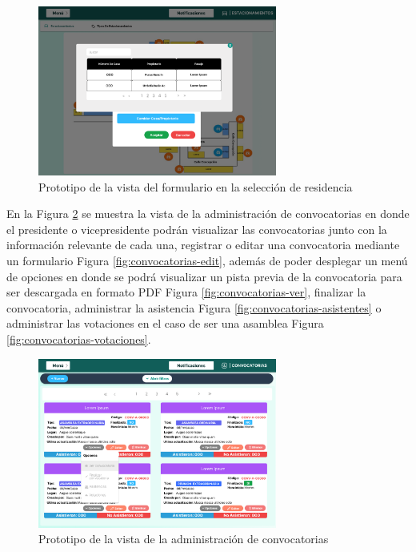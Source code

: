 \begin{figure}[H]
    \centering
    \includegraphics[width=0.7\textwidth]{resources/images/estacionamientos-form-vista}
    \caption{Prototipo de la vista del formulario en la selección de residencia}
    \label{fig:parqueaderos formulario seleccion residente}
\end{figure}

En la Figura \ref{fig:convocatorias} se muestra la vista de la administración de convocatorias en donde el presidente o vicepresidente podrán visualizar las convocatorias junto con la información relevante de cada una, registrar o editar una convocatoria mediante un formulario Figura \ref{fig:convocatorias-edit}, además de poder desplegar un menú de opciones en donde se podrá visualizar un pista previa de la convocatoria para ser descargada en formato PDF Figura \ref{fig:convocatorias-ver}, finalizar la convocatoria, administrar la asistencia Figura \ref{fig:convocatorias-asistentes} o administrar las votaciones en el caso de ser una asamblea Figura \ref{fig:convocatorias-votaciones}.

\begin{figure}[H]
    \centering
    \includegraphics[width=0.7\textwidth]{resources/images/convocatorias}
    \caption{Prototipo de la vista de la administración de convocatorias}
    \label{fig:convocatorias}
\end{figure}

